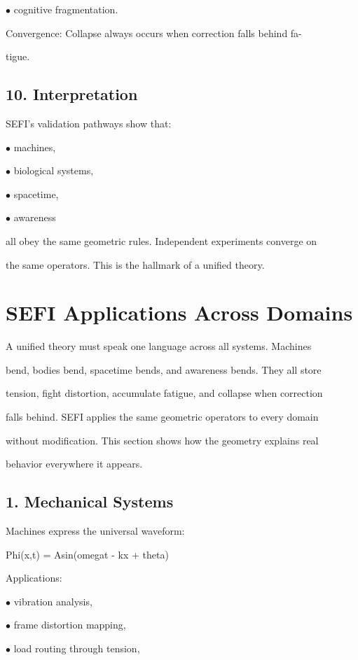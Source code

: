 \documentclass[10pt]{article}
\begin{document}
\noindent $\bullet$ cognitive fragmentation.

Convergence: Collapse always occurs when correction falls behind fa-

tigue.

\subsection*{10. Interpretation}
SEFI's validation pathways show that:

\noindent $\bullet$ machines,

\noindent $\bullet$ biological systems,

\noindent $\bullet$ spacetime,

\noindent $\bullet$ awareness

all obey the same geometric rules. Independent experiments converge on

the same operators. This is the hallmark of a unified theory.


\section*{SEFI Applications Across Domains}
A unified theory must speak one language across all systems. Machines

bend, bodies bend, spacetime bends, and awareness bends. They all store

tension, fight distortion, accumulate fatigue, and collapse when correction

falls behind. SEFI applies the same geometric operators to every domain

without modification. This section shows how the geometry explains real

behavior everywhere it appears.

\subsection*{1. Mechanical Systems}
Machines express the universal waveform:

Phi(x,t) = Asin(omegat - kx + theta)

Applications:

\noindent $\bullet$ vibration analysis,

\noindent $\bullet$ frame distortion mapping,

\noindent $\bullet$ load routing through tension,
\end{document}
